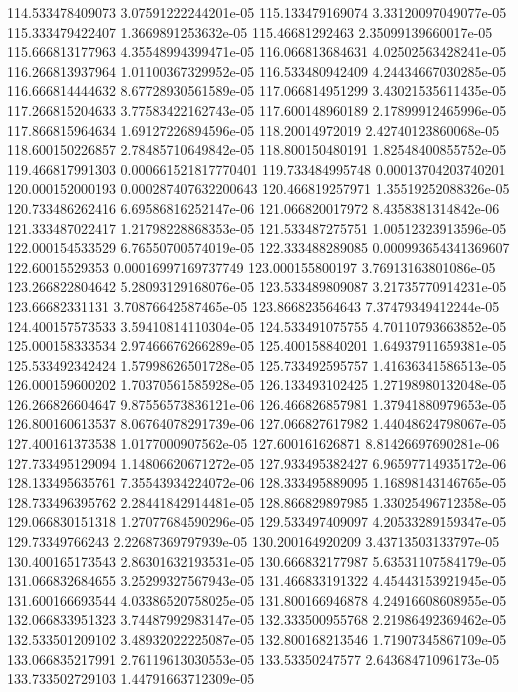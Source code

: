 {114.533478409073 3.07591222244201e-05
115.133479169074 3.33120097049077e-05
115.333479422407 1.3669891253632e-05
115.46681292463 2.35099139660017e-05
115.666813177963 4.35548994399471e-05
116.066813684631 4.02502563428241e-05
116.266813937964 1.01100367329952e-05
116.533480942409 4.24434667030285e-05
116.666814444632 8.67728930561589e-05
117.066814951299 3.43021535611435e-05
117.266815204633 3.77583422162743e-05
117.600148960189 2.17899912465996e-05
117.866815964634 1.69127226894596e-05
118.20014972019 2.42740123860068e-05
118.600150226857 2.78485710649842e-05
118.800150480191 1.82548400855752e-05
119.466817991303 0.000661521817770401
119.733484995748 0.00013704203740201
120.000152000193 0.000287407632200643
120.466819257971 1.35519252088326e-05
120.733486262416 6.69586816252147e-06
121.066820017972 8.4358381314842e-06
121.333487022417 1.21798228868353e-05
121.533487275751 1.00512323913596e-05
122.000154533529 6.76550700574019e-05
122.333488289085 0.000993654341369607
122.60015529353 0.00016997169737749
123.000155800197 3.76913163801086e-05
123.266822804642 5.28093129168076e-05
123.533489809087 3.21735770914231e-05
123.66682331131 3.70876642587465e-05
123.866823564643 7.37479349412244e-05
124.400157573533 3.59410814110304e-05
124.533491075755 4.70110793663852e-05
125.000158333534 2.97466676266289e-05
125.400158840201 1.64937911659381e-05
125.533492342424 1.57998626501728e-05
125.733492595757 1.41636341586513e-05
126.000159600202 1.70370561585928e-05
126.133493102425 1.27198980132048e-05
126.266826604647 9.87556573836121e-06
126.466826857981 1.37941880979653e-05
126.800160613537 8.06764078291739e-06
127.066827617982 1.44048624798067e-05
127.400161373538 1.0177000907562e-05
127.600161626871 8.81426697690281e-06
127.733495129094 1.14806620671272e-05
127.933495382427 6.96597714935172e-06
128.133495635761 7.35543934224072e-06
128.333495889095 1.16898143146765e-05
128.733496395762 2.28441842914481e-05
128.866829897985 1.33025496712358e-05
129.066830151318 1.27077684590296e-05
129.533497409097 4.20533289159347e-05
129.73349766243 2.22687369797939e-05
130.200164920209 3.43713503133797e-05
130.400165173543 2.86301632193531e-05
130.666832177987 5.63531107584179e-05
131.066832684655 3.25299327567943e-05
131.466833191322 4.45443153921945e-05
131.600166693544 4.03386520758025e-05
131.800166946878 4.24916608608955e-05
132.066833951323 3.74487992983147e-05
132.333500955768 2.21986492369462e-05
132.533501209102 3.48932022225087e-05
132.800168213546 1.71907345867109e-05
133.066835217991 2.76119613030553e-05
133.53350247577 2.64368471096173e-05
133.733502729103 1.44791663712309e-05
}
